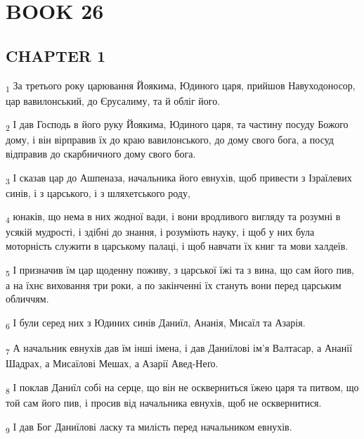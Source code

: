 \section{BOOK 26}
\subsection{CHAPTER 1}
\begin{tcolorbox}
\textsubscript{1} За третього року царювання Йоякима, Юдиного царя, прийшов Навуходоносор, цар вавилонський, до Єрусалиму, та й обліг його.
\end{tcolorbox}
\begin{tcolorbox}
\textsubscript{2} І дав Господь в його руку Йоякима, Юдиного царя, та частину посуду Божого дому, і він вірправив їх до краю вавилонського, до дому свого бога, а посуд відправив до скарбничного дому свого бога.
\end{tcolorbox}
\begin{tcolorbox}
\textsubscript{3} І сказав цар до Ашпеназа, начальника його евнухів, щоб привести з Ізраїлевих синів, і з царського, і з шляхетського роду,
\end{tcolorbox}
\begin{tcolorbox}
\textsubscript{4} юнаків, що нема в них жодної вади, і вони вродливого вигляду та розумні в усякій мудрості, і здібні до знання, і розуміють науку, і щоб у них була моторність служити в царському палаці, і щоб навчати їх книг та мови халдеїв.
\end{tcolorbox}
\begin{tcolorbox}
\textsubscript{5} І призначив їм цар щоденну поживу, з царської їжі та з вина, що сам його пив, а на їхнє виховання три роки, а по закінченні їх стануть вони перед царським обличчям.
\end{tcolorbox}
\begin{tcolorbox}
\textsubscript{6} І були серед них з Юдиних синів Даниїл, Ананія, Мисаїл та Азарія.
\end{tcolorbox}
\begin{tcolorbox}
\textsubscript{7} А начальник евнухів дав їм інші імена, і дав Даниїлові ім'я Валтасар, а Ананії Шадрах, а Мисаїлові Мешах, а Азарії Авед-Неґо.
\end{tcolorbox}
\begin{tcolorbox}
\textsubscript{8} І поклав Даниїл собі на серце, що він не оскверниться їжею царя та питвом, що той сам його пив, і просив від начальника евнухів, щоб не осквернитися.
\end{tcolorbox}
\begin{tcolorbox}
\textsubscript{9} І дав Бог Даниїлові ласку та милість перед начальником евнухів.
\end{tcolorbox}
